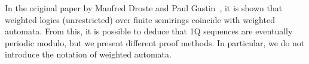 \documentclass[12pt]{article}
\theoremstyle{definition}
\begin{document}
In the original paper by Manfred Droste and Paul Gastin~\cite{DrosteG07}, it is shown that weighted logics (unrestricted) over finite semirings coincide with weighted automata. From this, it is possible to deduce that 1Q sequences are eventually periodic modulo, but we present different proof methods. In particular, we do not introduce the notation of weighted automata.









\end{document}
